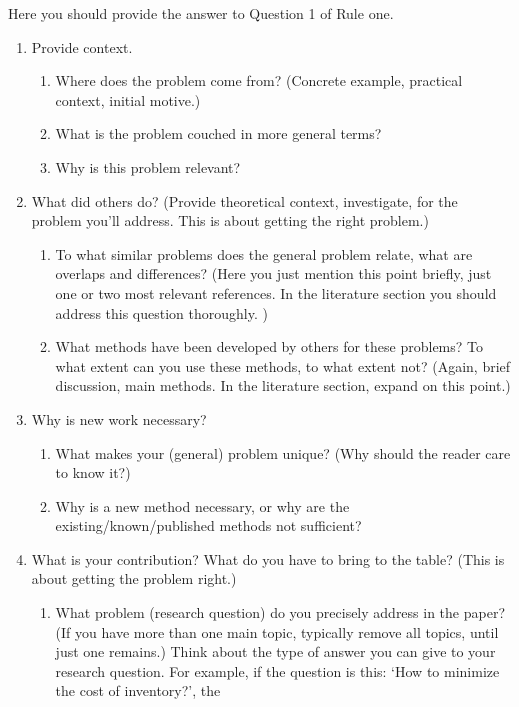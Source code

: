 \documentclass{article}
\begin{document}
Here you should provide the answer to Question 1 of Rule one. 

\begin{enumerate}
\item Provide context.
  \begin{enumerate}
\item Where does the problem come from? (Concrete example, practical context, initial motive.)
\item What is the problem couched in more general terms?
\item Why is this problem relevant?
  \end{enumerate}
\item What did others do? (Provide theoretical context, investigate,
  for the problem you'll address.  This is about getting the right
  problem.)
  \begin{enumerate}
  \item To what similar problems does the general problem relate, what
    are overlaps and differences?  (Here you just mention this point
    briefly, just one or two most relevant references.  In the
    literature section you should address this question thoroughly. )
  \item What methods have been developed by others for these problems?
    To what extent can you use these methods, to what extent not?
    (Again, brief discussion, main methods.  In the literature
    section, expand on this point.)
  \end{enumerate}
\item Why is new work necessary?
  \begin{enumerate}
  \item What makes your (general) problem unique? (Why should the
    reader care to know it?)
\item Why is a new method necessary, or why are the
  existing/known/published methods not sufficient? 
  \end{enumerate}
\item What is your contribution? What do you have to bring to the
  table? (This is about getting the problem right.)
  \begin{enumerate}
  \item What problem (research question) do you precisely address in
    the paper? (If you have more than one main topic, typically remove
    all topics, until just one remains.) Think about the type of
    answer you can give to your research question. For example, if the
    question is this: `How to minimize the cost of inventory?', the

\end{enumerate}
\end{enumerate}
\end{document}
